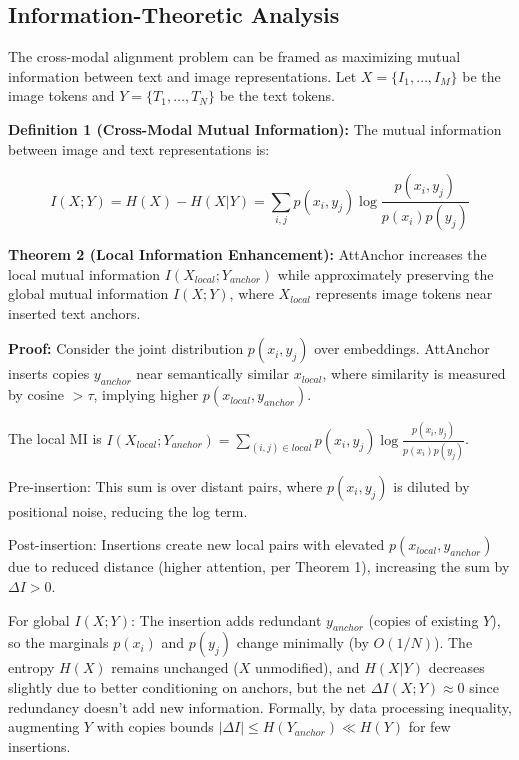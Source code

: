 \documentclass[11pt]{article}
\begin{document}
\subsection{Information-Theoretic Analysis}

The cross-modal alignment problem can be framed as maximizing mutual information between text and image representations. Let $X = \{I_1, \dots, I_M\}$ be the image tokens and $Y = \{T_1, \dots, T_N\}$ be the text tokens.

\textbf{Definition 1 (Cross-Modal Mutual Information):} The mutual information between image and text representations is:

\begin{equation}
I(X; Y) = H(X) - H(X|Y) = \sum_{i,j} p(x_i, y_j) \log \frac{p(x_i, y_j)}{p(x_i) p(y_j)}
\end{equation}

\textbf{Theorem 2 (Local Information Enhancement):} AttAnchor increases the local mutual information $I(X_{local}; Y_{anchor})$ while approximately preserving the global mutual information $I(X; Y)$, where $X_{local}$ represents image tokens near inserted text anchors.

\textbf{Proof:} Consider the joint distribution $p(x_i, y_j)$ over embeddings. AttAnchor inserts copies $y_{anchor}$ near semantically similar $x_{local}$, where similarity is measured by cosine $> \tau$, implying higher $p(x_{local}, y_{anchor})$.

The local MI is $I(X_{local}; Y_{anchor}) = \sum_{(i,j) \in local} p(x_i, y_j) \log \frac{p(x_i, y_j)}{p(x_i) p(y_j)}$.

Pre-insertion: This sum is over distant pairs, where $p(x_i, y_j)$ is diluted by positional noise, reducing the log term.

Post-insertion: Insertions create new local pairs with elevated $p(x_{local}, y_{anchor})$ due to reduced distance (higher attention, per Theorem 1), increasing the sum by $\Delta I > 0$.

For global $I(X; Y)$: The insertion adds redundant $y_{anchor}$ (copies of existing $Y$), so the marginals $p(x_i)$ and $p(y_j)$ change minimally (by $O(1/N)$). The entropy $H(X)$ remains unchanged ($X$ unmodified), and $H(X|Y)$ decreases slightly due to better conditioning on anchors, but the net $\Delta I(X; Y) \approx 0$ since redundancy doesn't add new information. Formally, by data processing inequality, augmenting $Y$ with copies bounds $|\Delta I| \leq H(Y_{anchor}) \ll H(Y)$ for few insertions.
\end{document}
